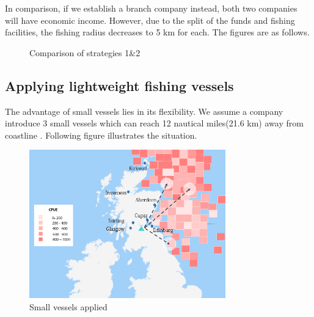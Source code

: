 \documentclass{mcmthesis}
\begin{document}
In comparison, if we establish a branch company instead, both two companies will have economic income. However, due to the split of the funds and fishing facilities, the fishing radius decreases to 5 km for each.
The figures are as follows.
\begin{figure}[htbp]
\centering
{}
\quad
{}
\caption{Comparison of strategies 1\&2}
\end{figure}

\subsection{Applying lightweight fishing vessels}
The advantage of small vessels lies in its flexibility. We assume a company introduce 3 small vessels which can reach 12 nautical miles(21.6 km) away from coastline . Following figure illustrates the situation.
\textbf{}
\begin{figure}[h]
\centering
\includegraphics[width=8.5cm]{./figures/s3.png}
\caption{Small vessels applied}
\end{figure}\\
\end{document}
